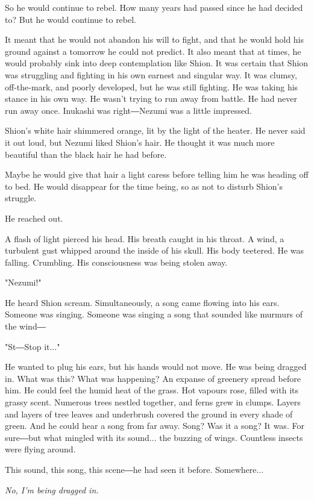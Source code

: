 So he would continue to rebel. How many years had passed since he had
decided to? But he would continue to rebel.

It meant that he would not abandon his will to fight, and that he would
hold his ground against a tomorrow he could not predict. It also meant
that at times, he would probably sink into deep contemplation like
Shion. It was certain that Shion was struggling and fighting in his own
earnest and singular way. It was clumsy, off-the-mark, and poorly
developed, but he was still fighting. He was taking his stance in his
own way. He wasn't trying to run away from battle. He had never run away
once. Inukashi was right―Nezumi was a little impressed.

Shion's white hair shimmered orange, lit by the light of the heater. He
never said it out loud, but Nezumi liked Shion's hair. He thought it was
much more beautiful than the black hair he had before.

Maybe he would give that hair a light caress before telling him he was
heading off to bed. He would disappear for the time being, so as not to
disturb Shion's struggle.

He reached out.

A flash of light pierced his head. His breath caught in his throat. A
wind, a turbulent gust whipped around the inside of his skull. His body
teetered. He was falling. Crumbling. His consciousness was being stolen
away.

"Nezumi!"

He heard Shion scream. Simultaneously, a song came flowing into his
ears. Someone was singing. Someone was singing a song that sounded like
murmurs of the wind―

"St―Stop it..."

He wanted to plug his ears, but his hands would not move. He was being
dragged in. What was this? What was happening? An expanse of greenery
spread before him. He could feel the humid heat of the grass. Hot
vapours rose, filled with its grassy scent. Numerous trees nestled
together, and ferns grew in clumps. Layers and layers of tree leaves and
underbrush covered the ground in every shade of green. And he could hear
a song from far away. Song? Was it a song? It was. For sure―but what
mingled with its sound... the buzzing of wings. Countless insects were
flying around.

This sound, this song, this scene―he had seen it before. Somewhere...

\emph{No, I'm being dragged in.}

